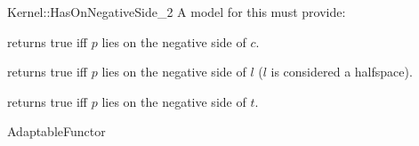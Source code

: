 \begin{ccRefFunctionObjectConcept}{Kernel::HasOnNegativeSide_2}
A model for this must provide:


{returns true iff $p$ lies on the negative side of $c$.}

{returns true iff $p$ lies on the negative side of $l$ 
($l$ is considered a halfspace).}

{returns true iff $p$ lies on the negative side of $t$.}

\ccRefines
AdaptableFunctor

\ccSeeAlso
{} \\
\\
\\


\end{ccRefFunctionObjectConcept}
